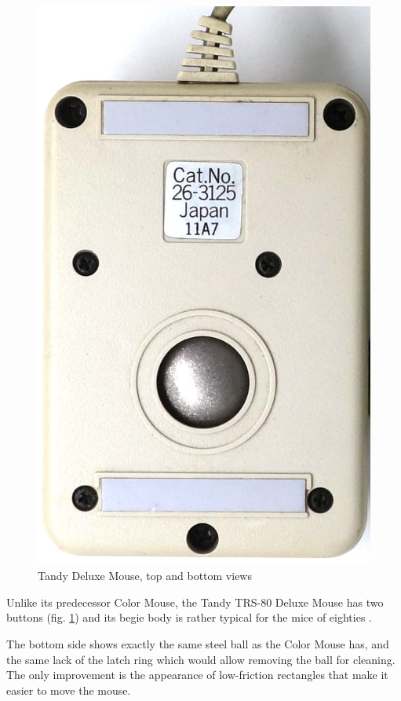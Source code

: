 \documentclass[11pt, a4paper]{article}
\begin{document}
\begin{figure}[h]
    \includegraphics[scale=0.65]{1988_tandy_trs80_deluxe_mouse/bottom_30.jpg}
    \caption{Tandy Deluxe Mouse, top and bottom views}
    \label{fig:TandyDeluxeMouseTopAndBottom}
\end{figure}

Unlike its predecessor Color Mouse, the Tandy TRS-80 Deluxe Mouse has two buttons (fig. \ref{fig:TandyDeluxeMouseTopAndBottom}) and its begie body is rather typical for the mice of eighties \cite{hierophant}.

The bottom side shows exactly the same steel ball as the Color Mouse has, and the same lack of the latch ring which would allow removing the ball for cleaning. The only improvement is the appearance of low-friction rectangles that make it easier to move the mouse.
\end{document}
